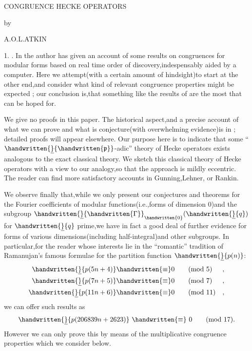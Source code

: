 \begin{center}
CONGRUENCE HECKE OPERATORS

by

A.O.L.ATKIN
\end{center}

1. . \quad In  the author has given an account of some results on congruences for modular forms based on real time order of discovery,indespensably aided by a computer. Here we attempt(with a certain amount of hindsight)to start at the other end,and consider what kind of relevant congruence properties might be expected   ; our conclusion is,that something like the results of  are the most that can be hoped for.

We give no proofs in this paper. The historical aspect,and a precise account of what we can prove and what is conjecture(with overwhelming evidence)is in ; detailed proofs will appear elsewhere. Our purpose here is to indicate that some \reversemarginpar{}\normalmarginpar``$\handwritten{\underline}{\handwritten{\mathfrak{p}}}$-adic'' theory of Hecke operators exists analogous to the exact classical theory. We sketch this classical theory of Hecke operators with a view to our analogy,so that the approach is mildly eccentric. The reader can find more satisfactory accounts in Gunning,Lehner, or Rankin.

We observe finally that,while we only present our conjectures and theorems for the Fourier coefficients of modular functions(i.e.,forms of dimension $0$)and the subgroup $\handwritten{\underline}{\handwritten{\Gamma}}_{\handwritten{0}}(\handwritten{\underline}{q})$ for $\handwritten{\underline}{q}$ prime,we have in fact a good deal of further evidence for forms of various dimensions(including half-integral)and other subgroups. In particular,for the reader whose interests lie in the ``romantic'' tradition of Ramanujan's famous formulae for the partition function $\handwritten{\underline}{p(n)}$:
\[
\begin{aligned}
\handwritten{\underline}{p(5n+4)}  &\handwritten{\equiv} 0 \qquad (\mathrm{mod}\ 5)  &,\\
\handwritten{\underline}{p(7n+5)}  &\handwritten{\equiv} 0 \qquad (\mathrm{mod}\ 7)  &,\\
\handwritten{\underline}{p(11n+6)} &\handwritten{\equiv} 0 \qquad (\mathrm{mod}\ 11) &,
\end{aligned}
\]
we can offer such results as
\[
\handwritten{\underline}{p(206839n+2623)}\ \handwritten{\equiv}\ 0 \qquad (\mathrm{mod}\ 17).
\]
However we can only prove this by means of the multiplicative congruence properties which we consider below.

